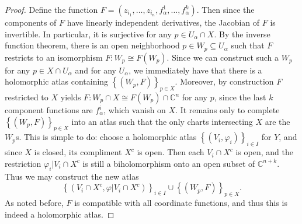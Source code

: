 \documentclass[11pt, letterpaper]{article}
\theoremstyle{plain}
\begin{document}
\begin{proof}
	Define the function $F= (z_{i_1} , \ldots ,z_{i_n}, f_\alpha ^1, \ldots ,f_\alpha ^k)$. Then since the components of $F$ have linearly independent derivatives, the Jacobian of $F$ is invertible. In particular, it is surjective for any $p\in U_\alpha \cap X$. By the inverse function theorem, there is an open neighborhood $p\in W_p \subseteq U_\alpha $ such that $F$ restricts to an isomorphism $F : W_p \cong F(W_p)$. Since we can construct such a $W_p$ for any $p\in X \cap U_\alpha $ and for any $U_\alpha $, we immediately have that there is a holomorphic atlas containing $\left\{ (W_p,F) \right\} _{p\in X} $. Moreover, by construction $F$ restricted to $X$ yields $F : W_p \cap X \cong F(W_p)\cap \mathbb{C} ^n$ for any $p$, since the last $k$ component functions are $f_\alpha ^i$, which vanish on $X$. It remains only to complete $\left\{ (W_p,F) \right\} _{p\in X} $ into an atlas such that the only charts intersecting $X$ are the $W_p$s. This is simple to do: choose a holomorphic atlas $\left\{ (V_i,\varphi _i) \right\} _{i\in I} $ for $Y$, and since $X$ is closed, its compliment $X^{c} $ is open. Then each $V_i \cap X^{c} $ is open, and the restriction $\varphi _i | V_i \cap X^{c} $ is still a biholomorphism onto an open subset of $\mathbb{C} ^{n+k} $. Thus we may construct the new atlas
	\[
		\left\{ \left(V_i \cap X^{c} ,\varphi |V_i \cap X^{c} \right) \right\} _{i\in I} \cup \left\{ (W_p,F) \right\} _{p\in X} 
	.\]
	As noted before, $F$ is compatible with all coordinate functions, and thus this is indeed a holomorphic atlas.
\end{proof}
\end{document}
